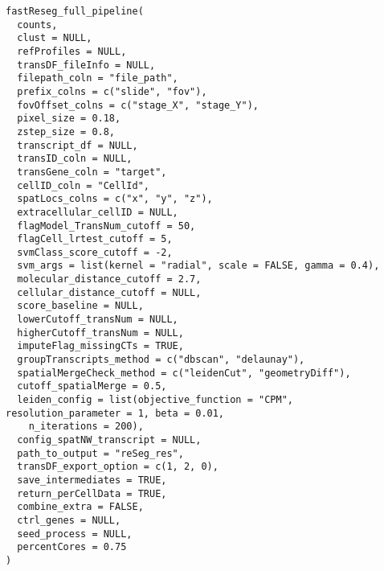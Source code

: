 \documentclass[letterpaper]{book}
\begin{document}
\begin{Usage}
\begin{verbatim}
fastReseg_full_pipeline(
  counts,
  clust = NULL,
  refProfiles = NULL,
  transDF_fileInfo = NULL,
  filepath_coln = "file_path",
  prefix_colns = c("slide", "fov"),
  fovOffset_colns = c("stage_X", "stage_Y"),
  pixel_size = 0.18,
  zstep_size = 0.8,
  transcript_df = NULL,
  transID_coln = NULL,
  transGene_coln = "target",
  cellID_coln = "CellId",
  spatLocs_colns = c("x", "y", "z"),
  extracellular_cellID = NULL,
  flagModel_TransNum_cutoff = 50,
  flagCell_lrtest_cutoff = 5,
  svmClass_score_cutoff = -2,
  svm_args = list(kernel = "radial", scale = FALSE, gamma = 0.4),
  molecular_distance_cutoff = 2.7,
  cellular_distance_cutoff = NULL,
  score_baseline = NULL,
  lowerCutoff_transNum = NULL,
  higherCutoff_transNum = NULL,
  imputeFlag_missingCTs = TRUE,
  groupTranscripts_method = c("dbscan", "delaunay"),
  spatialMergeCheck_method = c("leidenCut", "geometryDiff"),
  cutoff_spatialMerge = 0.5,
  leiden_config = list(objective_function = "CPM", resolution_parameter = 1, beta = 0.01,
    n_iterations = 200),
  config_spatNW_transcript = NULL,
  path_to_output = "reSeg_res",
  transDF_export_option = c(1, 2, 0),
  save_intermediates = TRUE,
  return_perCellData = TRUE,
  combine_extra = FALSE,
  ctrl_genes = NULL,
  seed_process = NULL,
  percentCores = 0.75
)
\end{verbatim}
\end{Usage}
%
\end{document}
